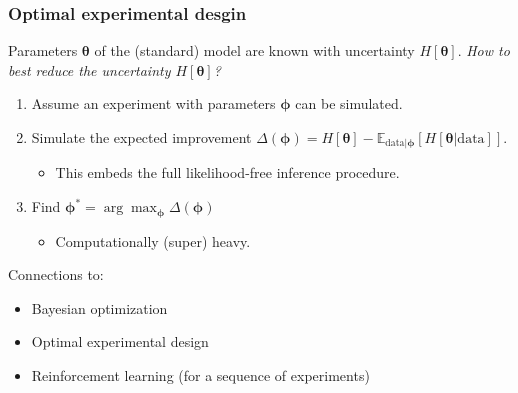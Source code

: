 \documentclass{beamer}
\newcommand{\bftheta}{{\bm \theta}}
\begin{document}
\begin{frame}
    \frametitle{Optimal experimental desgin}

    \begin{center}
    \end{center}

    Parameters $\bftheta$ of the (standard) model are known with uncertainty $H[\bftheta]$.
    {\it How to best reduce the uncertainty $H[\bftheta]$? }

    \begin{enumerate}
        \item Assume an experiment with parameters $\bm \phi$ can be simulated.
        \item Simulate the expected improvement $\Delta(\bm \phi) = H[\bftheta] - \mathbb{E}_{\text{data} | \bm \phi} [ H[\bftheta | \text{data} ] ]$.
            {\scriptsize
            \begin{itemize}
                \item This embeds the full likelihood-free inference procedure.
            \end{itemize}}
        \item Find $\bm \phi^* = \arg \max_{\bm \phi} \Delta(\bm \phi) $
            {\scriptsize
            \begin{itemize}
                \item Computationally (super) heavy.
            \end{itemize}}
    \end{enumerate}

    \vspace{0.5cm}

    {\scriptsize Connections to:
    \begin{itemize}
        \item Bayesian optimization
        \item Optimal experimental design
        \item Reinforcement learning (for a sequence of experiments)
    \end{itemize}}

\end{frame}
\end{document}
